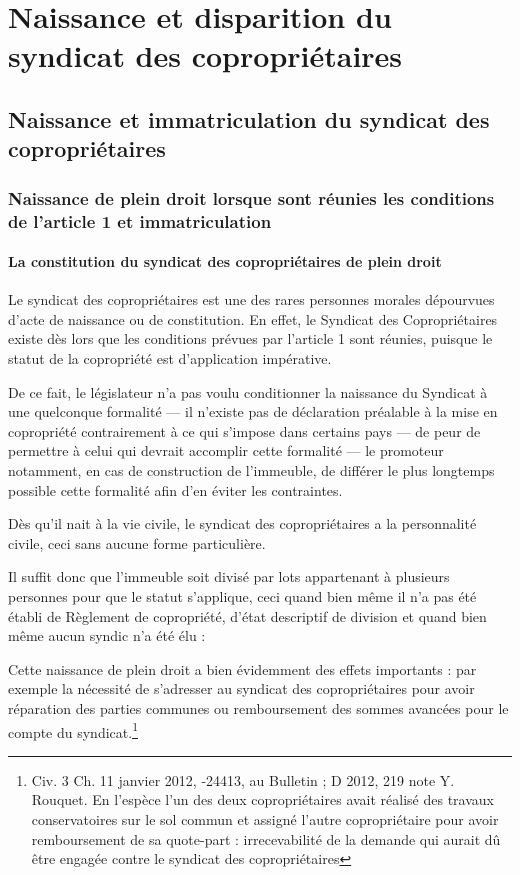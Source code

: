 \chapter[Naissance et disparition du Syndicat]{Naissance et disparition du syndicat des copropriétaires}

\section[Naissance et immatriculation]{Naissance et immatriculation du syndicat des copropriétaires}

	\subsection{Naissance de plein droit lorsque sont réunies les conditions de l’article 1\ier{} et immatriculation}

		\subsubsection{La constitution du syndicat des copropriétaires de plein droit}
		
			Le syndicat des copropriétaires est une des rares personnes morales dépourvues d’acte de naissance ou de constitution. En effet, le Syndicat des Copropriétaires existe dès lors que les conditions prévues par l’article 1\ier{} sont réunies, puisque le statut de la copropriété est d’application impérative.
			
			De ce fait, le législateur n’a pas voulu conditionner la naissance du Syndicat à une quelconque formalité --- il n’existe pas de déclaration préalable à la mise en copropriété contrairement à ce qui s’impose dans certains pays --- de peur de permettre à celui qui devrait accomplir cette formalité --- le promoteur notamment, en cas de construction de l’immeuble, de différer le plus longtemps possible cette formalité afin d’en éviter les contraintes.
			
			Dès qu’il nait à la vie civile, le syndicat des copropriétaires a la personnalité civile, ceci sans aucune forme particulière.
			
			Il suffit donc que l’immeuble soit divisé par lots appartenant à plusieurs personnes pour que le statut s’applique, ceci quand bien même il n’a pas été établi de Règlement de copropriété, d’état descriptif de division et quand bien même aucun syndic n’a été élu :
			
			Cette naissance de plein droit a bien évidemment des effets importants : par exemple la nécessité de s’adresser au syndicat des copropriétaires pour avoir réparation des parties communes ou remboursement des sommes avancées pour le compte du syndicat.\footnote{
			Civ. 3\degre{} Ch. 11 janvier 2012, -24413, au Bulletin ; D 2012, 219 note Y. Rouquet. En l’espèce l’un des deux copropriétaires avait réalisé des travaux conservatoires sur le sol commun et assigné l’autre copropriétaire pour avoir remboursement de sa quote-part : irrecevabilité de la demande qui aurait dû être engagée contre le syndicat des copropriétaires}
		
